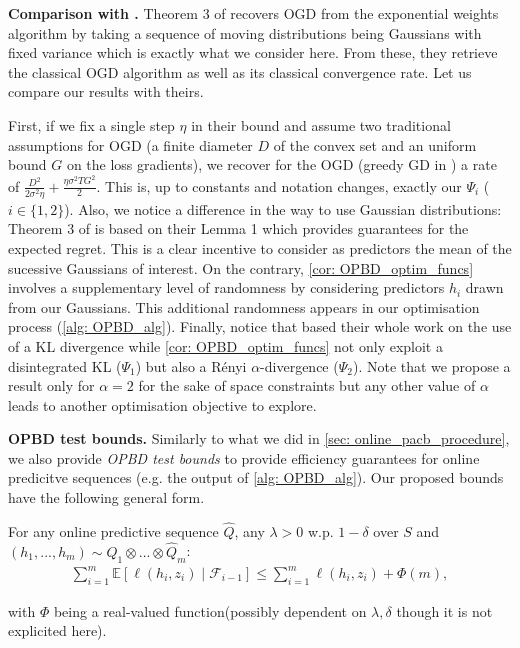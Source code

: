 \textbf{Comparison with \cite{hoeven2018many}.} Theorem 3 of \citet{hoeven2018many} recovers OGD from the exponential weights algorithm by taking a sequence of moving distributions being Gaussians with fixed variance which is exactly what we consider here. From these, they retrieve the classical OGD algorithm as well as its classical convergence rate. Let us compare our results with theirs.

First, if we fix a single step $\eta$ in their bound and assume two traditional assumptions for OGD (a finite diameter $D$ of the convex set and an uniform bound $G$ on the loss gradients), we recover for the OGD (greedy GD in \citealp{hoeven2018many}) a rate of $ \frac{D^2}{2\sigma^2\eta} + \frac{\eta\sigma^2TG^2}{2}$. This is, up to constants and notation changes, exactly our $\Psi_i$ ($i\in\{1,2\}$).
Also, we notice a difference in the way to use Gaussian distributions: Theorem 3 of \citet{hoeven2018many} is based on their Lemma 1 which provides guarantees for the expected regret. This is a clear incentive to consider as predictors the mean of the sucessive Gaussians of interest. On the contrary, \cref{cor: OPBD_optim_funcs} involves a supplementary level of randomness by considering predictors $h_i$ drawn from our Gaussians. This additional randomness appears in our optimisation process (\cref{alg: OPBD_alg}).
Finally, notice that \citet{hoeven2018many} based their whole work on the use of a KL divergence  while \cref{cor: OPBD_optim_funcs} not only exploit a disintegrated KL ($\Psi_1$) but also a Rényi $\alpha$-divergence ($\Psi_2$). Note that we propose a result only for $\alpha=2$ for the sake of space constraints but any other value of $\alpha$ leads to another optimisation objective to explore.


\textbf{OPBD test bounds.}
Similarly to what we did in \cref{sec: online_pacb_procedure}, we also provide \emph{OPBD test bounds} to provide efficiency guarantees for online predicitve sequences (e.g. the output of \cref{alg: OPBD_alg}). Our proposed bounds have the following general form.

For any online predictive sequence $\hat{Q}$, any $\lambda>0$ w.p. $1-\delta$ over $S$ and $(h_1,...,h_{m})\sim \hat{Q}_1\otimes...\otimes \hat{Q}_{m}$:
\begin{align}
  \label{eq: OPBD_test_bound}
  \sum_{i=1}^m  \mathbb{E}[\ell(h_i,z_i) \mid \mathcal{F}_{i-1}]   \leq \sum_{i=1}^m  \ell(h_i,z_i)   + \Phi(m),
\end{align}

with $\Phi$ being a real-valued function(possibly dependent on $\lambda,\delta$ though it is not explicited here).

